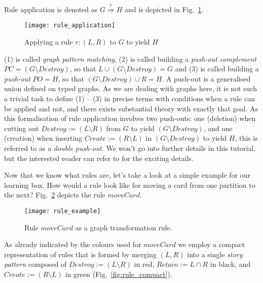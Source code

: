 Rule application is denoted as $G \stackrel{r}{\Rightarrow} H$ and is depicted in Fig.~\ref{fig:rule_application}. 

\begin{figure}[htp]
\begin{center}
  \texttt{[image: rule\_application]}
  \caption[]{Applying a rule $r: (L,R)$ to $G$ to yield $H$} 
  \label{fig:rule_application}
\end{center}
\end{figure}

(1) is called \emph{graph pattern matching}, (2) is called building a \emph{push-out complement} $PC = (G\setminus Destroy)$, so that $L \cup(G\setminus
Destroy) = G$ and (3) is called building a \emph{push-out} $PO = H$, so that $(G\setminus Destroy) \cup R = H$.
A push-out is a generalised union defined on typed graphs.  As we are dealing with graphs here, it is not such a trivial task to define (1) -- (3) in precise
terms with conditions when a rule can be applied and not, and there exists substantial theory with exactly that goal.
As this formalisation of rule application involves two push-outs: one (deletion) when cutting out $Destroy := (L\setminus R)$ from $G$ to yield $(G\setminus
Destroy)$, and one (creation) when inserting $Create := (R\setminus L)$ in $(G\setminus Destroy)$ to yield $H$, this is referred to as a \emph{double push-out}.
We won't go into further details in this tutorial, but the interested reader can refer to \cite{EEPT06} for the exciting details.

Now that we know what rules are, let's take a look at a simple example for our learning box. How would a rule look like for moving a card from one partition to
the next?  Fig.~\ref{fig:rule_example} depicts the rule $moveCard$.
  
\begin{figure}[htp]
\begin{center}
  \texttt{[image: rule\_example]}
  \caption[]{Rule $moveCard$ as a graph transformation rule.}	
  \label{fig:rule_example}
\end{center}
\end{figure}

As already indicated by the colours used for $moveCard$ we employ a compact representation of rules that is formed by merging $(L,R)$ into a single \emph{story
pattern} composed of  $Destroy := (L\setminus R)$ in red, $Retain :=  L\cap R$ in black, and $Create := (R\setminus L)$ in  green (Fig.~\ref{fig:rule_compact}).

